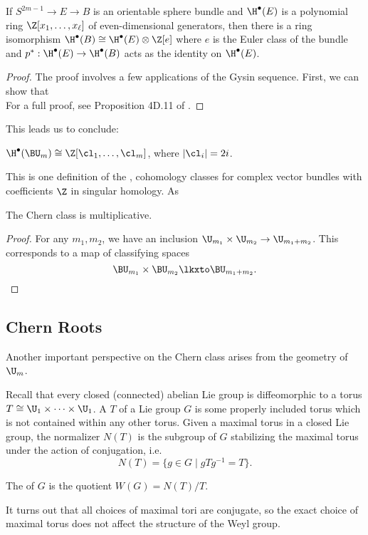 \begin{lemma}
	If $S^{2m-1} \to E \to B$ is an orientable sphere bundle and $\H^\bullet(E)$ is a polynomial ring $\Z[x_1,\ldots,x_\ell]$ of even-dimensional generators, then there is a ring isomorphism $\H^\bullet(B)\cong \H^\bullet(E)\otimes \Z[e]$ where $e$ is the Euler class of the bundle and $p^* : \H^\bullet(E) \to \H^\bullet(B)$ acts as the identity on $\H^\bullet(E)$.
\end{lemma}
\begin{proof}
	The proof involves a few applications of the Gysin sequence. First, we can show that 
\[
\]
For a full proof, see Proposition 4D.11 of \cite{hatcher2002topology}.
\end{proof}

This leads us to conclude:
\begin{proposition}
	$\H^\bullet(\BU_m)\cong \Z[\cl_1,\ldots, \cl_m]$, where $|\cl_i|=2i$.
\end{proposition}

This is one definition of the , cohomology classes for complex vector bundles with coefficients $\Z$ in singular homology. As 

\begin{proposition}
	The Chern class is multiplicative.
\end{proposition}
\begin{proof}
	For any $m_1,m_2$, we have an inclusion $\U_{m_1}\times \U_{m_2} \to \U_{m_1+m_2}$. This corresponds to a map of classifying spaces
	\[
		\BU_{m_1}\times \BU_{m_2} \lkxto \BU_{m_1+m_2}.
	\]
\end{proof}

\subsection{Chern Roots}

Another important perspective on the Chern class arises from the geometry of $\U_m$. 

Recall that every closed (connected) abelian Lie group is diffeomorphic to a torus $T \cong \U_1\times \cdots\times \U_1$. A  $T$ of a Lie group $G$ is some properly included torus which is not contained within any other torus. Given a maximal torus in a closed Lie group, the normalizer $N(T)$ is the subgroup of $G$ stabilizing the maximal torus under the action of conjugation, i.e. 
\[
	N(T) = \{ g \in G \mid gTg^{-1} = T\}.
\]
\begin{definition}
	The  of $G$ is the quotient $W(G)=N(T)/T$.
\end{definition}
It turns out that all choices of maximal tori are conjugate, so the exact choice of maximal torus does not affect the structure of the Weyl group.

